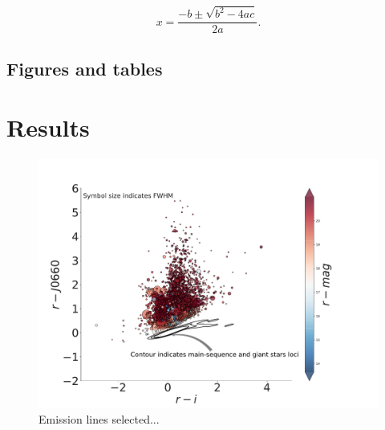 \documentclass[fleqn,usenatbib]{mnras}
\begin{document}


\begin{equation}

    x=\frac{-b\pm\sqrt{b^2-4ac}}{2a}.
	\label{eq:quadratic}
\end{equation}


\subsection{Figures and tables}

\section{Results}
\label{sec:results}

\begin{figure}
	\includegraphics[width=0.9\linewidth]{Figs/final-emitters.pdf}
    \caption{Emission lines selected...}
    \label{fig:emission}
\end{figure}
\end{document}
